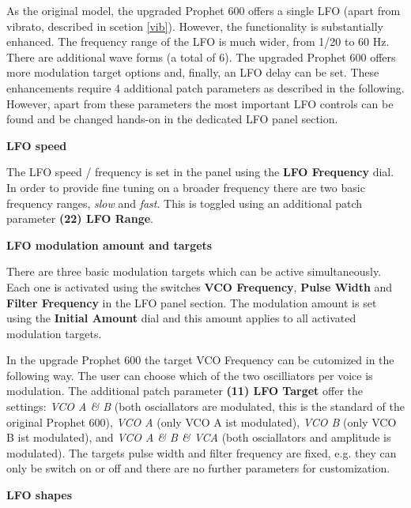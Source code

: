 As the original model, the upgraded Prophet 600 offers a single LFO (apart from vibrato, described in scetion \ref{vib}). However, the functionality is substantially enhanced. The frequency range of the LFO is much wider, from 1/20 to 60 Hz. There are additional wave forms (a total of 6). The upgraded Prophet 600 offers more modulation target options and, finally, an LFO delay can be set. These enhancements require 4 additional patch parameters as described in the following. However, apart from these parameters the most important LFO controls can be found and be changed hands-on in the dedicated LFO panel section. 


\begin{center}
\end{center}

\textbf{LFO speed}

The LFO speed / frequency is set in the panel using the \textbf{LFO Frequency} dial. In order to provide fine tuning on a broader frequency there are two basic frequency ranges, \textit{slow} and \textit{fast}. This is toggled using an additional patch parameter \textbf{(22) LFO Range}. 

\textbf{LFO modulation amount and targets}

There are three basic modulation targets which can be active simultaneously. Each one is activated using the switches \textbf{VCO Frequency}, \textbf{Pulse Width} and \textbf{Filter Frequency} in the LFO panel section. The modulation amount is set using the \textbf{Initial Amount} dial and this amount applies to all activated modulation targets. 

In the upgrade Prophet 600 the target VCO Frequency can be cutomized in the following way. The user can choose which of the two oscilliators per voice is modulation. The additional patch parameter \textbf{(11) LFO Target}
offer the settings: \textit{VCO A \& B} (both osciallators are modulated, this is the standard of the original Prophet 600), \textit{VCO A} (only VCO A ist modulated), \textit{VCO B} (only VCO B ist modulated),  and \textit{VCO A \& B \& VCA} (both osciallators and amplitude is modulated). The targets pulse width and filter frequency are fixed, e.g. they can only be switch on or off and there are no further parameters for customization.

\textbf{LFO shapes}

